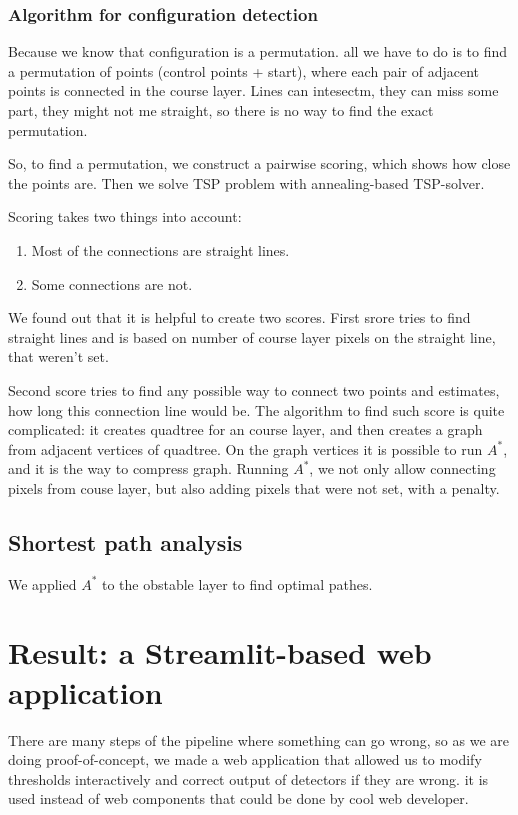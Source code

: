 \documentclass[a4paper,12pt]{extarticle}
\begin{document}
\subsubsection{Algorithm for configuration detection}

Because we know that configuration is a permutation. all we have to do is to find a permutation of points (control points + start), where each pair of adjacent points is connected in the course layer.
Lines can intesectm, they can miss some part, they might not me straight, so there is no way to find the exact permutation.

So, to find a permutation, we construct a pairwise scoring, which shows how close the points are.
Then we solve TSP problem with annealing-based TSP-solver.

Scoring takes two things into account:
\begin{enumerate}
    \item Most of the connections are straight lines.
    \item Some connections are not.
\end{enumerate}

We found out that it is helpful to create two scores.
First srore tries to find straight lines and is based on number of course layer pixels on the straight line, that weren't set.

Second score tries to find any possible way to connect two points and estimates, how long this connection line would be.
The algorithm to find such score is quite complicated: it creates quadtree for an course layer, and then creates a graph from adjacent vertices of quadtree.
On the graph vertices it is possible to run $A^*$, and it is the way to compress graph.
Running $A^*$, we not only allow connecting pixels from couse layer, but also adding pixels that were not set, with a penalty.

\subsection{Shortest path analysis}

We applied $A^*$ to the obstable layer to find optimal pathes.

\section{Result: a Streamlit-based web application}

There are many steps of the pipeline where something can go wrong, so as we are doing proof-of-concept, we made a web application that allowed us to modify thresholds interactively and correct output of detectors if they are wrong. it is used instead of web components that could be done by cool web developer.
\end{document}

